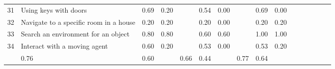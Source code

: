 \documentclass{article}
\begin{document}
\begin{table}[!t]
\begin{tabular}{llccc c ccc c ccc ccc}
\rowcolor[HTML]{E3E3E3}
31  & Using keys with doors & \cellcolor[HTML]{a864cb}0.69 & \cellcolor[HTML]{d2e4f0}0.20 & & \cellcolor[HTML]{bb86d6}0.54 & \cellcolor[HTML]{ffffff}0.00 & & \cellcolor[HTML]{a864cb}0.69 & \cellcolor[HTML]{ffffff}0.00 \\ 
\rowcolor[HTML]{FFFFFF}
32  & Navigate to a specific room in a house & \cellcolor[HTML]{e6d2f0}0.20 & \cellcolor[HTML]{d2e4f0}0.20 & & \cellcolor[HTML]{e6d2f0}0.20 & \cellcolor[HTML]{ffffff}0.00 & & \cellcolor[HTML]{e6d2f0}0.20 & \cellcolor[HTML]{d2e4f0}0.20 \\ 
\rowcolor[HTML]{E3E3E3}
33  & Search an environment for an object & \cellcolor[HTML]{9a4cc3}0.80 & \cellcolor[HTML]{4c92c3}0.80 & & \cellcolor[HTML]{b379d2}0.60 & \cellcolor[HTML]{79add2}0.60 & & \cellcolor[HTML]{811fb4}1.00 & \cellcolor[HTML]{1f77b4}1.00 \\ 
\rowcolor[HTML]{FFFFFF}
34  & Interact with a moving agent & \cellcolor[HTML]{b379d2}0.60 & \cellcolor[HTML]{d2e4f0}0.20 & & \cellcolor[HTML]{bc88d7}0.53 & \cellcolor[HTML]{ffffff}0.00 & & \cellcolor[HTML]{bc88d7}0.53 & \cellcolor[HTML]{d2e4f0}0.20 \\ 
\midrule
\rowcolor[HTML]{E3E3E3}
\multicolumn{2}{l}{\textbf{Average (Unit Tests)}} & \cellcolor[HTML]{9f55c6}0.76 & \cellcolor[HTML]{79add2}0.60 & & \cellcolor[HTML]{ac6bce}0.66 & \cellcolor[HTML]{9dc3de}0.44 & & \cellcolor[HTML]{9e52c5}0.77 & \cellcolor[HTML]{70a8cf}0.64 \\ 

\bottomrule
\end{tabular}
\end{table}















\end{document}
